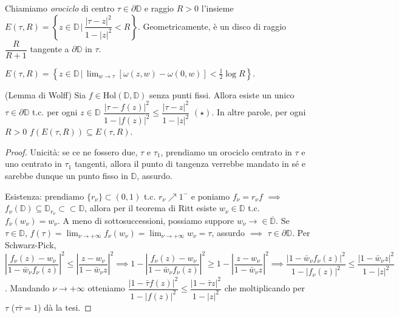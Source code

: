 \begin{defn}
  Chiamiamo \textit{orociclo} di centro $\tau \in \partial\mathbb{D}$ e raggio $R>0$ l'insieme $E(\tau, R)=\left\{z \in \mathbb{D} \, \bigg| \, \dfrac{|\tau-z|^2}{1-|z|^2}<R \right\}$. Geometricamente, è un disco di raggio $\dfrac{R}{R+1}$ tangente a $\partial \mathbb{D}$ in $\tau$.
\end{defn}

\begin{exc}
  $\displaystyle E(\tau, R)=\left\{z \in \mathbb{D} \, \bigg| \, \lim_{w \longrightarrow \tau} [\omega(z, w)-\omega(0, w)]<\frac{1}{2}\log{R}\right\}$.
\end{exc}

\begin{lm}
  (Lemma di Wolff) Sia $f \in \text{Hol}(\mathbb{D}, \mathbb{D})$ senza punti fissi. Allora esiste un unico $\tau \in \partial\mathbb{D}$ t.c. per ogni $z \in \mathbb{D}$ $\dfrac{|\tau-f(z)|^2}{1-|f(z)|^2} \le \dfrac{|\tau-z|^2}{1-|z|^2}$ $(\star)$.
  In altre parole, per ogni $R>0$ $f(E(\tau, R)) \subseteq E(\tau, R)$.
\end{lm}

\begin{proof}
  Unicità: se ce ne fossero due, $\tau$ e $\tau_1$, prendiamo un orociclo centrato in $\tau$ e uno centrato in $\tau_1$ tangenti, allora il punto di tangenza verrebbe mandato in sé e sarebbe dunque un punto fisso in $\mathbb{D}$, assurdo.

  Esistenza: prendiamo $\{r_{\nu}\} \subset (0, 1)$ t.c. $r_{\nu} \nearrow 1^{-}$ e poniamo $f_{\nu}=r_{\nu}f$ $\implies$ $f_{\nu}(\mathbb{D}) \subseteq \mathbb{D}_{r_{\nu}} \subset\subset \mathbb{D}$,
  allora per il teorema di Ritt esiste $w_{\nu} \in \mathbb{D}$ t.c. $f_{\nu}(w_{\nu})=w_{\nu}$. A meno di sottosuccessioni, possiamo suppore $w_{\nu} \longrightarrow \in \overline{\mathbb{D}}$.
  Se $\tau \in \mathbb{D}$, $\displaystyle f(\tau)=\lim_{\nu \longrightarrow +\infty} f_{\nu}(w_{\nu})=\lim_{\nu \longrightarrow +\infty} w_{\nu}=\tau$, assurdo $\implies$ $\tau \in \partial\mathbb{D}$.
  Per Schwarz-Pick, $\left|\dfrac{f_{\nu}(z)-w_{\nu}}{1-\bar{w}_{\nu}f_{\nu}(z)}\right|^2 \le \left|\dfrac{z-w_{\nu}}{1-\bar{w}_{\nu}z}\right|^2 \implies 1-\left|\dfrac{f_{\nu}(z)-w_{\nu}}{1-\bar{w}_{\nu}f_{\nu}(z)}\right|^2 \ge 1-\left|\dfrac{z-w_{\nu}}{1-\bar{w}_{\nu}z}\right|^2 \implies \dfrac{|1-\bar{w}_{\nu}f_{\nu}(z)|^2}{1-|f_{\nu}(z)|^2} \le \dfrac{|1-\bar{w}_{\nu}z|^2}{1-|z|^2}$.
  Mandando $\nu \longrightarrow +\infty$ otteniamo $\dfrac{|1-\bar{\tau}f(z)|^2}{1-|f(z)|^2} \le \dfrac{|1-\bar{\tau}z|^2}{1-|z|^2}$ che moltiplicando per $\tau$ ($\tau\bar{\tau}=1$) dà la tesi.
\end{proof}

